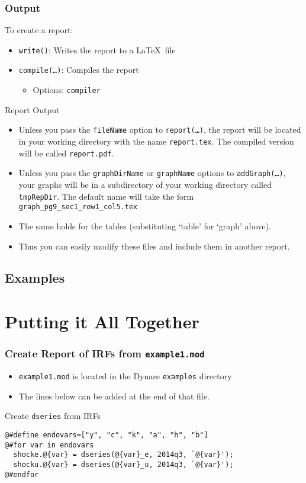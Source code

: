 \documentclass[10pt]{beamer}
\begin{document}
\begin{frame}
  \frametitle{Output}
  To create a report:
  \begin{itemize}
  \item \texttt{write()}: Writes the report to a \LaTeX\ file
  \item \texttt{compile(\ldots)}: Compiles the report
    \begin{itemize}
    \item Options: \texttt{compiler}
    \end{itemize}
  \end{itemize}
  Report Output
  \begin{itemize}
  \item Unless you pass the \texttt{fileName} option to \texttt{report(\ldots)}, the report will be located in your working directory with the name \texttt{report.tex}. The compiled version will be called \texttt{report.pdf}.
  \item Unless you pass the \texttt{graphDirName} or \texttt{graphName} options to \texttt{addGraph(\ldots)}, your graphs will be in a subdirectory of your working directory called \texttt{tmpRepDir}. The default name will take the form \texttt{graph\_pg9\_sec1\_row1\_col5.tex}
  \item The same holds for the tables (substituting `table' for `graph' above).
  \item Thus you can easily modify these files and include them in another report.
  \end{itemize}
\end{frame}


\subsection{Examples}

\section{Putting it All Together}
\begin{frame}[fragile=singleslide]
  \frametitle{Create Report of IRFs from \texttt{example1.mod}}
  \begin{itemize}
  \item \texttt{example1.mod} is located in the Dynare \texttt{examples} directory
  \item The lines below can be added at the end of that file.
  \end{itemize}
  \begin{block}{Create \texttt{dseries} from IRFs}
\begin{verbatim}
@#define endovars=["y", "c", "k", "a", "h", "b"]
@#for var in endovars
  shocke.@{var} = dseries(@{var}_e, 2014q3, `@{var}');
  shocku.@{var} = dseries(@{var}_u, 2014q3, `@{var}');
@#endfor
\end{verbatim}
  \end{block}
\end{frame}
\end{document}
